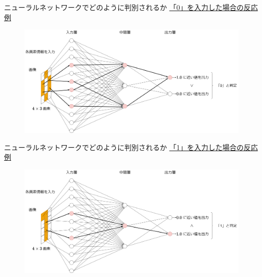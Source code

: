\documentclass[dvipdfmx,aspectratio=169]{beamer}
\begin{document}
	\begin{frame}{ニューラルネットワークでどのように判別されるか}
		\underline{「0」を入力した場合の反応例}
		\begin{figure}
			\centering
			\includegraphics[width=0.8\linewidth]{img/「0」を入力した場合のニューラルネットワークの反応の例}
		\end{figure}
	\end{frame}
	\begin{frame}{ニューラルネットワークでどのように判別されるか}
		\underline{「1」を入力した場合の反応例}
		\begin{figure}
			\centering
			\includegraphics[width=0.8\linewidth]{img/「1」を入力した場合のニューラルネットワークの反応の例}
		\end{figure}
	\end{frame}
\end{document}
